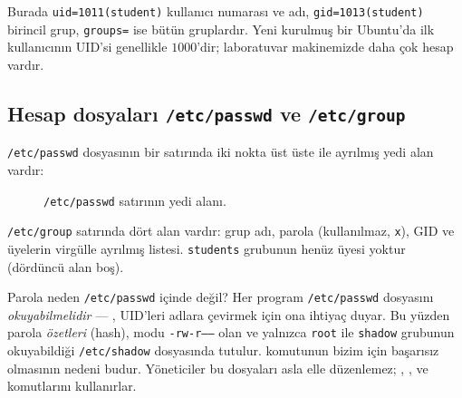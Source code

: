 

Burada \texttt{uid=1011(student)} kullanıcı numarası ve adı, \texttt{gid=1013(student)} birincil grup, \texttt{groups=} ise bütün gruplardır. Yeni kurulmuş bir Ubuntu'da ilk kullanıcının UID'si genellikle $1000$'dir; laboratuvar makinemizde daha çok hesap vardır.

\subsection{Hesap dosyaları \texttt{/etc/passwd} ve \texttt{/etc/group}}



\texttt{/etc/passwd} dosyasının bir satırında iki nokta üst üste ile ayrılmış yedi alan vardır:

\begin{figure}[H]
\centering
{}
\caption{\texttt{/etc/passwd} satırının yedi alanı.}
\end{figure}

\texttt{/etc/group} satırında dört alan vardır: grup adı, parola (kullanılmaz, \texttt{x}), GID ve üyelerin virgülle ayrılmış listesi. \texttt{students} grubunun henüz üyesi yoktur (dördüncü alan boş).

Parola neden \texttt{/etc/passwd} içinde değil? Her program \texttt{/etc/passwd} dosyasını \emph{okuyabilmelidir} --- , UID'leri adlara çevirmek için ona ihtiyaç duyar. Bu yüzden parola \emph{özetleri} (hash), modu \texttt{-rw-r-----} olan ve yalnızca \texttt{root} ile \texttt{shadow} grubunun okuyabildiği \texttt{/etc/shadow} dosyasında tutulur.  komutunun bizim için başarısız olmasının nedeni budur. Yöneticiler bu dosyaları asla elle düzenlemez; , ,  ve  komutlarını kullanırlar.

